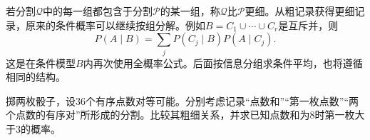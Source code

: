 若分割\(\mathcal Q\)中的每一组都包含于分割\(\mathcal P\)的某一组，称\(\mathcal Q\)比\(\mathcal P\){\heiti 更细}。从粗记录获得更细记录，原来的条件概率可以继续按组分解。例如\(B=C_1\cup\cdots\cup C_r\)是互斥并，则
\[
 P(A\mid B)=\sum_j P(C_j\mid B)P(A\mid C_j).
\]
这是在条件模型\(B\)内再次使用全概率公式。后面按信息分组求条件平均，也将遵循相同的结构。

\begin{exercise}
掷两枚骰子，设36个有序点数对等可能。分别考虑记录“点数和”“第一枚点数”“两个点数的有序对”所形成的分割。比较其粗细关系，并求已知点数和为8时第一枚大于3的概率。
\end{exercise}
